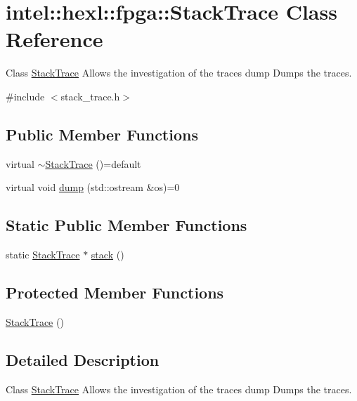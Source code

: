 \hypertarget{classintel_1_1hexl_1_1fpga_1_1StackTrace}{\section{intel\-:\-:hexl\-:\-:fpga\-:\-:Stack\-Trace Class Reference}
\label{classintel_1_1hexl_1_1fpga_1_1StackTrace}
}


Class \hyperlink{classintel_1_1hexl_1_1fpga_1_1StackTrace}{Stack\-Trace} Allows the investigation of the traces  dump Dumps the traces.  




{\ttfamily \#include $<$stack\-\_\-trace.\-h$>$}

\subsection*{Public Member Functions}
\begin{DoxyCompactItemize}
\item 
virtual \hyperlink{classintel_1_1hexl_1_1fpga_1_1StackTrace_ae3665f0cc2097380b9a5fdd6330df6e5}{$\sim$\-Stack\-Trace} ()=default
\item 
virtual void \hyperlink{classintel_1_1hexl_1_1fpga_1_1StackTrace_a333d1509937db15dae0780b20da5b0ea}{dump} (std\-::ostream \&os)=0
\end{DoxyCompactItemize}
\subsection*{Static Public Member Functions}
\begin{DoxyCompactItemize}
\item 
static \hyperlink{classintel_1_1hexl_1_1fpga_1_1StackTrace}{Stack\-Trace} $\ast$ \hyperlink{classintel_1_1hexl_1_1fpga_1_1StackTrace_a13e71720d91b3ad78008fc4b71fe159c}{stack} ()
\end{DoxyCompactItemize}
\subsection*{Protected Member Functions}
\begin{DoxyCompactItemize}
\item 
\hyperlink{classintel_1_1hexl_1_1fpga_1_1StackTrace_a33b7e4305ba5ebd6d3210971528770f5}{Stack\-Trace} ()
\end{DoxyCompactItemize}


\subsection{Detailed Description}
Class \hyperlink{classintel_1_1hexl_1_1fpga_1_1StackTrace}{Stack\-Trace} Allows the investigation of the traces  dump Dumps the traces. 


